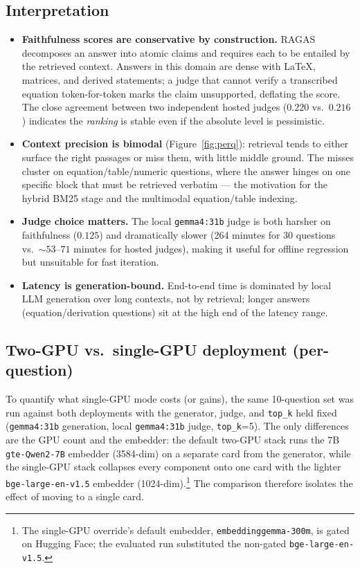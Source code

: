 \documentclass[11pt,a4paper]{article}
\newcommand{\code}[1]{\texttt{\small #1}}
\begin{document}
\subsection{Interpretation}
\begin{itemize}[leftmargin=1.4em,itemsep=3pt]
  \item \textbf{Faithfulness scores are conservative by construction.} RAGAS
        decomposes an answer into atomic claims and requires each to be entailed
        by the retrieved context. Answers in this domain are dense with LaTeX,
        matrices, and derived statements; a judge that cannot verify a transcribed
        equation token-for-token marks the claim unsupported, deflating the score.
        The close agreement between two independent hosted judges
        ($0.220$ vs.\ $0.216$) indicates the \emph{ranking} is stable even if the
        absolute level is pessimistic.
  \item \textbf{Context precision is bimodal} (Figure~\ref{fig:perq}): retrieval
        tends to either surface the right passages or miss them, with little
        middle ground. The misses cluster on equation/table/numeric questions,
        where the answer hinges on one specific block that must be retrieved
        verbatim — the motivation for the hybrid BM25 stage and the multimodal
        equation/table indexing.
  \item \textbf{Judge choice matters.} The local \code{gemma4:31b} judge is both
        harsher on faithfulness ($0.125$) and dramatically slower (264 minutes for
        30 questions vs.\ ${\sim}53$--$71$ minutes for hosted judges), making it
        useful for offline regression but unsuitable for fast iteration.
  \item \textbf{Latency is generation-bound.} End-to-end time is dominated by
        local LLM generation over long contexts, not by retrieval; longer answers
        (equation/derivation questions) sit at the high end of the latency range.
\end{itemize}

\subsection{Two-GPU vs.\ single-GPU deployment (per-question)}
To quantify what single-GPU mode costs (or gains), the same 10-question set was
run against both deployments with the generator, judge, and \code{top\_k} held
fixed (\code{gemma4:31b} generation, local \code{gemma4:31b} judge,
\code{top\_k}=5). The only differences are the GPU count and the embedder: the
default two-GPU stack runs the 7B \code{gte-Qwen2-7B} embedder (3584-dim) on a
separate card from the generator, while the single-GPU stack collapses every
component onto one card with the lighter \code{bge-large-en-v1.5} embedder
(1024-dim).\footnote{The single-GPU override's default embedder,
\code{embeddinggemma-300m}, is gated on Hugging Face; the evaluated run
substituted the non-gated \code{bge-large-en-v1.5}.} The comparison therefore
isolates the effect of moving to a single card.
\end{document}
